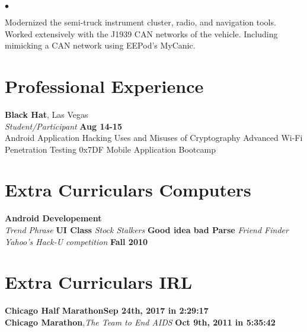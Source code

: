 \documentclass[margin,line]{res}
\newenvironment{list2}{
  \begin{list}{$\bullet$}{
      \setlength{\itemsep}{0in}
      \setlength{\parsep}{0in} \setlength{\parskip}{0in}
      \setlength{\topsep}{0in} \setlength{\partopsep}{0in} 
      \setlength{\leftmargin}{0.2in}}}{\end{list}}
\begin{document}
\begin{resume}
\begin{list2}
  \item Modernized the semi-truck instrument cluster, radio, and navigation tools. Worked extensively with the J1939 CAN networks of the vehicle. Including mimicking a CAN network using EEPod’s MyCanic.
\end{list2}



\section{\sc Professional Experience}

{\bf {Black Hat}}, {Las Vegas}\\
{\em Student/Participant } \hfill {\bf Aug 14-15}\\
Android Application Hacking
Uses and Misuses of Cryptography
Advanced Wi-Fi Penetration Testing
0x7DF Mobile Application Bootcamp

\section{\sc Extra Curriculars Computers}
{\bf Android Developement }\\
{\em Trend Phrase} \hfill {\bf  UI Class}
{\em Stock Stalkers} \hfill {\bf Good idea bad Parse}
{\em Friend Finder Yahoo’s Hack-U competition} \hfill {\bf Fall 2010} 


\section{\sc Extra Curriculars IRL}

{\bf Chicago Half Marathon}\hfill {\bf  Sep 24th, 2017 in 2:29:17 }\\

{\bf Chicago Marathon},{\em  The Team to End AIDS} \hfill {\bf  Oct 9th, 2011 in 5:35:42}\\



\end{resume}
\end{document}
